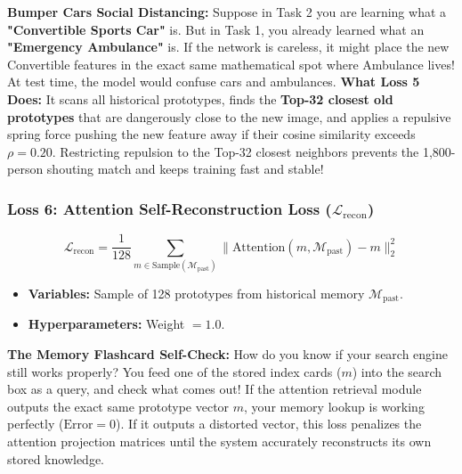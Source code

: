 \documentclass[11pt,a4paper]{article}
\begin{document}
\begin{callout}
\textbf{Bumper Cars Social Distancing:}\newline
Suppose in Task 2 you are learning what a \textbf{"Convertible Sports Car"} is. But in Task 1, you already learned what an \textbf{"Emergency Ambulance"} is.\newline
If the network is careless, it might place the new Convertible features in the exact same mathematical spot where Ambulance lives! At test time, the model would confuse cars and ambulances.\newline
\textbf{What Loss 5 Does:} It scans all historical prototypes, finds the \textbf{Top-32 closest old prototypes} that are dangerously close to the new image, and applies a repulsive spring force pushing the new feature away if their cosine similarity exceeds $\rho = 0.20$. Restricting repulsion to the Top-32 closest neighbors prevents the 1,800-person shouting match and keeps training fast and stable!
\end{callout}

\subsubsection{Loss 6: Attention Self-Reconstruction Loss ($\mathcal{L}_{\text{recon}}$)}
\begin{equation}
\mathcal{L}_{\text{recon}} = \frac{1}{128} \sum_{m \in \text{Sample}(\mathcal{M}_{\text{past}})} \|\text{Attention}(m, \mathcal{M}_{\text{past}}) - m\|_2^2
\end{equation}
\begin{itemize}[noitemsep]
    \item \textbf{Variables:} Sample of 128 prototypes from historical memory $\mathcal{M}_{\text{past}}$.
    \item \textbf{Hyperparameters:} Weight $= 1.0$.
\end{itemize}

\begin{callout}
\textbf{The Memory Flashcard Self-Check:}\newline
How do you know if your search engine still works properly?
You feed one of the stored index cards ($m$) into the search box as a query, and check what comes out!\newline
If the attention retrieval module outputs the exact same prototype vector $m$, your memory lookup is working perfectly ($\text{Error} = 0$). If it outputs a distorted vector, this loss penalizes the attention projection matrices until the system accurately reconstructs its own stored knowledge.
\end{callout}
\end{document}

